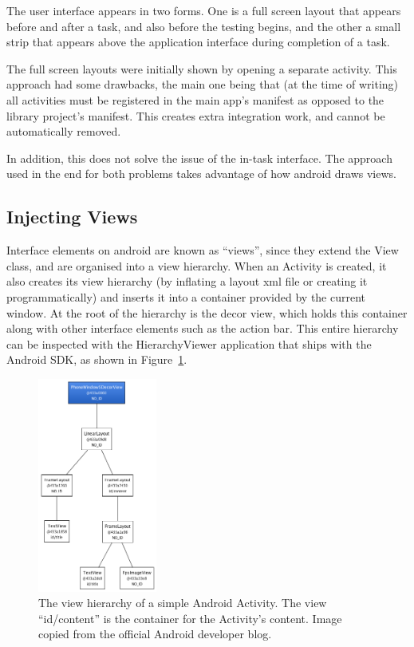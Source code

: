 The user interface appears in two forms. One is a full screen layout
that appears before and after a task, and also before the testing
begins, and the other a small strip that appears above the 
application interface during completion of a task.

The full screen layouts were initially shown by opening a separate
activity. This approach had some drawbacks, the main one being that
(at the time of writing) all activities must be registered in the
main app's manifest as opposed to the library project's manifest.
This creates extra integration work, and cannot be automatically
removed.

In addition, this does not solve the issue of the in-task interface.
The approach used in the end for both problems takes advantage of
how android draws views.

\subsection{Injecting Views}

Interface elements on android are known as ``views'', since they
extend the View class, and are organised into a view hierarchy.
When an Activity is created, it also creates its view hierarchy
(by inflating a layout xml file or creating it programmatically)
and inserts it into a container provided by the current window.
At the root of the hierarchy is the decor view, which holds this
container along with other interface elements such as the action
bar. This entire hierarchy can be inspected with the HierarchyViewer
application that ships with the Android SDK, as shown in 
Figure~\ref{fig:view-hierarchy}.

\begin{figure}[h]
  \centering
  \includegraphics[width=0.35\textwidth]{images/view-hierarchy}
  \caption{The view hierarchy of a simple Android Activity. The
           view ``id/content'' is the container for the Activity's
           content. Image copied from the official Android 
           developer blog.}
  \label{fig:view-hierarchy}
\end{figure}

